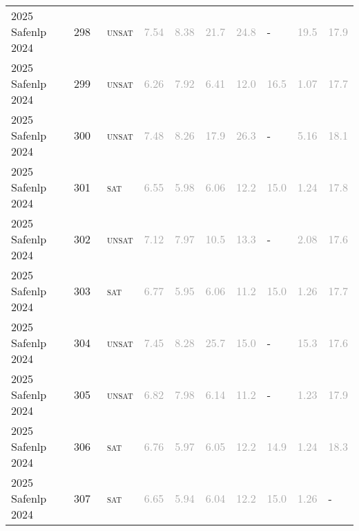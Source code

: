 \begin{center}
{\begin{longtable}{@{}llllllllll@{}}
2025 Safenlp 2024 & 298 & ~\textsc{unsat} & \textcolor{darkgray}{7.54} & \textcolor{darkgray}{8.38} & \textcolor{darkgray}{21.7} & \textcolor{darkgray}{24.8} & - & \textcolor{darkgray}{19.5} & \textcolor{darkgray}{17.9} \\
2025 Safenlp 2024 & 299 & ~\textsc{unsat} & \textcolor{darkgray}{6.26} & \textcolor{darkgray}{7.92} & \textcolor{darkgray}{6.41} & \textcolor{darkgray}{12.0} & \textcolor{darkgray}{16.5} & \textcolor{darkgray}{1.07} & \textcolor{darkgray}{17.7} \\
2025 Safenlp 2024 & 300 & ~\textsc{unsat} & \textcolor{darkgray}{7.48} & \textcolor{darkgray}{8.26} & \textcolor{darkgray}{17.9} & \textcolor{darkgray}{26.3} & - & \textcolor{darkgray}{5.16} & \textcolor{darkgray}{18.1} \\
2025 Safenlp 2024 & 301 & ~\textsc{sat} & \textcolor{darkgray}{6.55} & \textcolor{darkgray}{5.98} & \textcolor{darkgray}{6.06} & \textcolor{darkgray}{12.2} & \textcolor{darkgray}{15.0} & \textcolor{darkgray}{1.24} & \textcolor{darkgray}{17.8} \\
2025 Safenlp 2024 & 302 & ~\textsc{unsat} & \textcolor{darkgray}{7.12} & \textcolor{darkgray}{7.97} & \textcolor{darkgray}{10.5} & \textcolor{darkgray}{13.3} & - & \textcolor{darkgray}{2.08} & \textcolor{darkgray}{17.6} \\
2025 Safenlp 2024 & 303 & ~\textsc{sat} & \textcolor{darkgray}{6.77} & \textcolor{darkgray}{5.95} & \textcolor{darkgray}{6.06} & \textcolor{darkgray}{11.2} & \textcolor{darkgray}{15.0} & \textcolor{darkgray}{1.26} & \textcolor{darkgray}{17.7} \\
2025 Safenlp 2024 & 304 & ~\textsc{unsat} & \textcolor{darkgray}{7.45} & \textcolor{darkgray}{8.28} & \textcolor{darkgray}{25.7} & \textcolor{darkgray}{15.0} & - & \textcolor{darkgray}{15.3} & \textcolor{darkgray}{17.6} \\
2025 Safenlp 2024 & 305 & ~\textsc{unsat} & \textcolor{darkgray}{6.82} & \textcolor{darkgray}{7.98} & \textcolor{darkgray}{6.14} & \textcolor{darkgray}{11.2} & - & \textcolor{darkgray}{1.23} & \textcolor{darkgray}{17.9} \\
2025 Safenlp 2024 & 306 & ~\textsc{sat} & \textcolor{darkgray}{6.76} & \textcolor{darkgray}{5.97} & \textcolor{darkgray}{6.05} & \textcolor{darkgray}{12.2} & \textcolor{darkgray}{14.9} & \textcolor{darkgray}{1.24} & \textcolor{darkgray}{18.3} \\
2025 Safenlp 2024 & 307 & ~\textsc{sat} & \textcolor{darkgray}{6.65} & \textcolor{darkgray}{5.94} & \textcolor{darkgray}{6.04} & \textcolor{darkgray}{12.2} & \textcolor{darkgray}{15.0} & \textcolor{darkgray}{1.26} & - \\

\end{longtable}}
\end{center}
